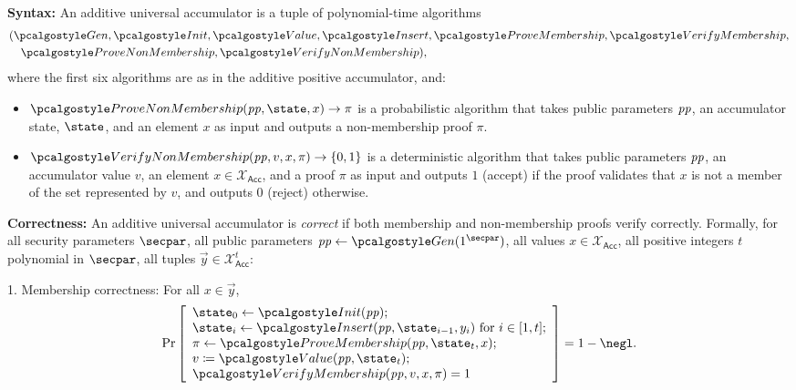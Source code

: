 \ifsolutions
\begin{mysolution}
  \textbf{Syntax:} An additive universal accumulator is a tuple of polynomial-time algorithms 
  \begin{align*}
    &(\algo{Gen}, \algo{Init}, \algo{Value}, \algo{Insert}, \algo{ProveMembership}, \algo{VerifyMembership},\\
    &\quad \algo{ProveNonMembership}, \algo{VerifyNonMembership}),
  \end{align*}
  where the first six algorithms are as in the additive positive accumulator, and:
  \begin{itemize}
    \item $\algo{ProveNonMembership}(\params, \state, x) \rightarrow \pi$ is a probabilistic algorithm that takes public parameters $\mathit{pp}$, an accumulator state, $\state$, and an element $x$ as input and outputs a non-membership proof $\pi$.
    \item $\algo{VerifyNonMembership}(\params, v, x, \pi) \rightarrow \{0, 1\}$ is a deterministic algorithm that takes public parameters $\mathit{pp}$, an accumulator value $v$, an element $x \in \mathcal{X}_\mathsf{Acc}$, and a proof $\pi$ as input and outputs $1$ (accept) if the proof validates that $x$ is not a member of the set represented by $v$, and outputs $0$ (reject) otherwise.
  \end{itemize}
  
  \textbf{Correctness:} An additive universal accumulator is \emph{correct} if both membership and non-membership proofs verify correctly.
  Formally, for all security parameters $\secpar$, all public parameters $\params \gets \algo{Gen}(1^\secpar)$, all values $x \in \mathcal{X}_\mathsf{Acc}$, all positive integers $t$ polynomial in $\secpar$, all tuples $\vec{y} \in \mathcal{X}_\mathsf{Acc}^{t}$:
  
  1. Membership correctness: For all $x \in \vec{y}$,
  \[
    \Pr\left[
    \begin{array}{l}
      \state_0 \gets \algo{Init}(\params); \\
      \state_i \gets \algo{Insert}(\params, \state_{i-1}, y_i) \text{ for } i \in [1, t]; \\
      \pi \gets \algo{ProveMembership}(\params, \state_t, x); \\
      v \defeq \algo{Value}(\params, \state_t); \\
      \algo{VerifyMembership}(\params, v, x, \pi) = 1
    \end{array}
    \right] = 1 - \negl.
  \]
  

\end{mysolution}
